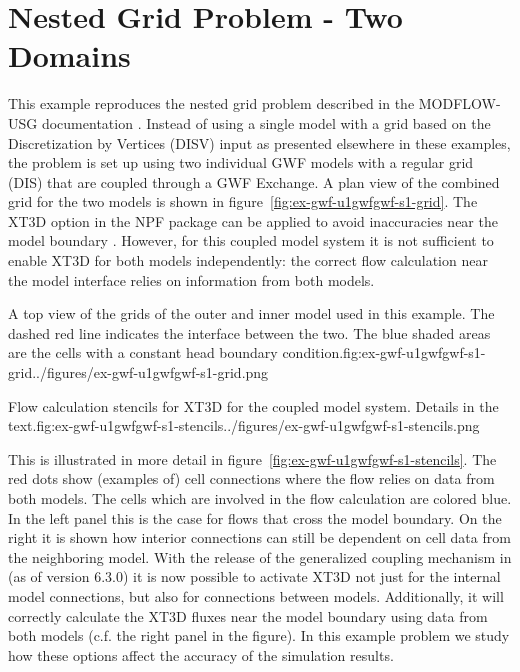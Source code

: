 \section{Nested Grid Problem - Two Domains}

This example reproduces the nested grid problem described in the MODFLOW-USG documentation \citep{modflowusg}. Instead of using a single model with a grid based on the Discretization by Vertices (DISV) input as presented elsewhere in these examples, the problem is set up using two individual GWF models with a regular grid (DIS) that are coupled through a GWF Exchange. A plan view of the combined grid for the two models is shown in figure~\ref{fig:ex-gwf-u1gwfgwf-s1-grid}. The XT3D option in the NPF package can be applied to avoid inaccuracies near the model boundary \citep{modflow6xt3d}. However, for this coupled model system it is not sufficient to enable XT3D for both models independently: the correct flow calculation near the model interface relies on information from both models. 

\begin{StandardFigure}{A top view of the grids of the outer and inner model used in this example. The dashed red line indicates the interface between the two. The blue shaded areas are the cells with a constant head boundary condition.}{fig:ex-gwf-u1gwfgwf-s1-grid}{../figures/ex-gwf-u1gwfgwf-s1-grid.png}
\end{StandardFigure}

\begin{StandardFigure}{Flow calculation stencils for XT3D for the coupled model system. Details in the text.}{fig:ex-gwf-u1gwfgwf-s1-stencils}{../figures/ex-gwf-u1gwfgwf-s1-stencils.png}
\end{StandardFigure} 

This is illustrated in more detail in figure~\ref{fig:ex-gwf-u1gwfgwf-s1-stencils}. The red dots show (examples of) cell connections where the flow relies on data from both models. The cells which are involved in the flow calculation are colored blue. In the left panel this is the case for flows that cross the model boundary. On the right it is shown how interior connections can still be dependent on cell data from the neighboring model. With the release of the generalized coupling mechanism in \mf (as of version 6.3.0) it is now possible to activate XT3D not just for the internal model connections, but also for connections between models. Additionally, it will correctly calculate the XT3D fluxes near the model boundary using data from both models (c.f. the right panel in the figure). In this example problem we study how these options affect the accuracy of the simulation results. 


